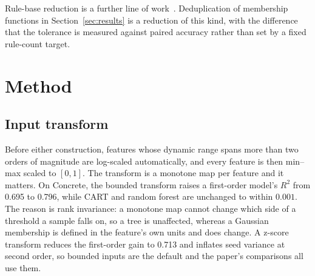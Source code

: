 \documentclass[journal]{IEEEtran}
\begin{document}
Rule-base reduction is a further line of work~\cite{alcala2007rule}. Deduplication of membership functions in Section~\ref{sec:results} is a reduction of this kind, with the difference that the tolerance is measured against paired accuracy rather than set by a fixed rule-count target.

\section{Method}
\label{sec:method}

\subsection{Input transform}
Before either construction, features whose dynamic range spans more than two orders of magnitude are log-scaled automatically, and every feature is then min--max scaled to $[0,1]$. The transform is a monotone map per feature and it matters. On Concrete, the bounded transform raises a first-order model's $R^2$ from 0.695 to 0.796, while CART and random forest are unchanged to within $0.001$. The reason is rank invariance: a monotone map cannot change which side of a threshold a sample falls on, so a tree is unaffected, whereas a Gaussian membership is defined in the feature's own units and does change. A z-score transform reduces the first-order gain to 0.713 and inflates seed variance at second order, so bounded inputs are the default and the paper's comparisons all use them.
\end{document}
